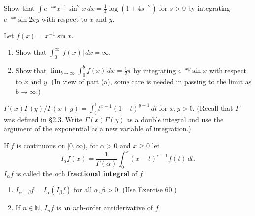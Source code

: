 	\begin{exercise}[Folland 2.58]
		Show that $\int e^{-sx} x^{-1} \sin^2 x \, dx = \frac{1}{4}\log(1 + 4s^{-2})$ for $s > 0$ by integrating $e^{-sx}\sin 2xy$ with respect to $x$ and $y$.
	\end{exercise}
	\begin{solution}

	\end{solution}

	\begin{exercise}[Folland 2.59]
		Let $f(x) = x^{-1}\sin x$.
		\begin{enumerate}[label=\textbf{\alph*.}]
			\item Show that $\int_0^\infty |f(x)| \, dx = \infty$.
			\item Show that $\lim_{b \to \infty} \int_0^b f(x) \, dx = \frac{1}{2}\pi$ by integrating $e^{-xy}\sin x$ with respect to $x$ and $y$. (In view of part (a), some care is needed in passing to the limit as $b \to \infty$.)
		\end{enumerate}
	\end{exercise}
	\begin{solution}

	\end{solution}

	\begin{exercise}[Folland 2.60]
		$\Gamma(x)\Gamma(y)/\Gamma(x+y) = \int_0^1 t^{x-1}(1-t)^{y-1} \, dt$ for $x, y > 0$. (Recall that $\Gamma$ was defined in \S 2.3. Write $\Gamma(x)\Gamma(y)$ as a double integral and use the argument of the exponential as a new variable of integration.)
	\end{exercise}
	\begin{solution}

	\end{solution}

	\begin{exercise}[Folland 2.61]
		If $f$ is continuous on $[0, \infty)$, for $\alpha > 0$ and $x \ge 0$ let
		\begin{equation}
			I_\alpha f(x) = \frac{1}{\Gamma(\alpha)} \int_0^x (x - t)^{\alpha - 1} f(t) \, dt.
		\end{equation}
		$I_\alpha f$ is called the $\alpha\text{th}$ \textbf{fractional integral} of $f$.
		\begin{enumerate}[label=\textbf{\alph*.}]
			\item $I_{\alpha+\beta} f = I_\alpha(I_\beta f)$ for all $\alpha, \beta > 0$. (Use Exercise 60.)
			\item If $n \in \mathbb{N}$, $I_n f$ is an $n\text{th}$-order antiderivative of $f$.
		\end{enumerate}
	\end{exercise}
	\begin{solution}

	\end{solution}

